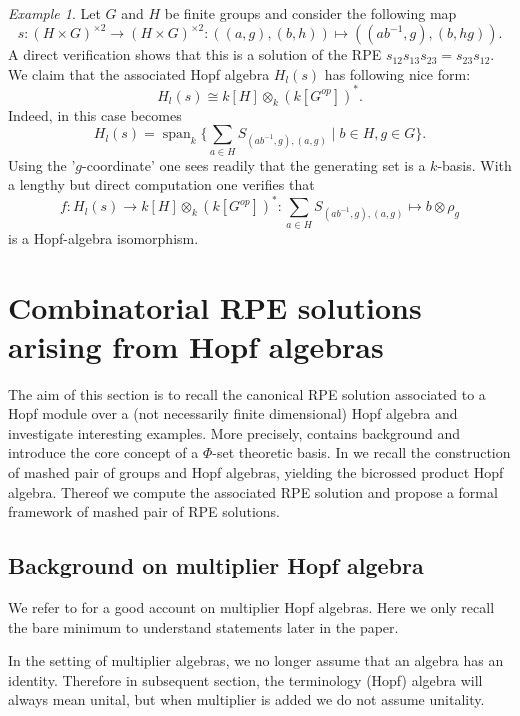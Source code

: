 \documentclass[a4paper,10pt]{amsart}
\theoremstyle{definition}
\theoremstyle{remark}
\newtheorem{example}[lemma]{Example}
\DeclareMathOperator{\SPAN}{span}
\begin{document}
\begin{example}\label{Hopf op grp and dual solution}
Let $G$ and $H$ be finite groups and consider the following map
$$s:(H \times G)^{\times 2} \rightarrow (H \times G)^{\times 2}: ((a,g),(b,h)) \mapsto ((ab^{-1},g), (b,hg)).$$
A direct verification shows that this is a solution of the RPE $s_{12}s_{13}s_{23} = s_{23}s_{12}.$ We claim that the associated Hopf algebra $H_l(s)$ has following nice form:
$$H_l(s) \cong k[H] \otimes_k (k[G^{op}])^*.$$
Indeed, in this case  becomes
$$H_l(s) = \SPAN_k \{ \sum_{a\in H} S_{(ab^{-1},g), (a,g)} \mid b\in H, g \in G \}.$$
Using the '$g$-coordinate' one sees readily that the generating set is a $k$-basis. With a lengthy but direct computation one verifies that 
$$f : H_l(s) \rightarrow k[H] \otimes_k (k[G^{op}])^*: \sum_{a\in H} S_{(ab^{-1},g), (a,g)} \mapsto b \otimes \rho_g$$
is a Hopf-algebra isomorphism. 
\end{example}

\section{Combinatorial RPE solutions arising from Hopf algebras}\label{section From hopf to sol}

The aim of this section is to recall the canonical RPE solution associated to a Hopf module over a (not necessarily finite dimensional) Hopf algebra and investigate interesting examples. More precisely,  contains background and introduce the core concept of a $\Phi$-set theoretic basis. In  we recall the construction of mashed pair of groups and Hopf algebras, yielding the bicrossed product Hopf algebra. Thereof we compute the associated RPE solution and propose a formal framework of mashed pair of RPE solutions.


\subsection{Background on multiplier Hopf algebra} \label{background multiplier}

We refer to \cite{Tim} for a good account on multiplier Hopf algebras. Here we only recall the bare minimum to understand statements later in the paper.

 In the setting of multiplier algebras, we no longer assume that an algebra has an identity. Therefore in subsequent section, the terminology (Hopf) algebra will always mean unital, but when multiplier is added we do not assume unitality. 
\end{document}
